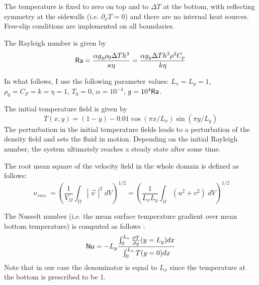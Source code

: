 The temperature is fixed to zero on top and to $\Delta T$ at the bottom, 
with reflecting symmetry at the sidewalls (i.e. $\partial_x T=0$) 
and there are no internal heat sources. 
Free-slip conditions are implemented on all boundaries. 

The Rayleigh number is given by
\begin{equation}
{\mathsf{Ra}} = \frac{\alpha g_y \rho_0 \Delta T h^3 }{\kappa \eta}
=\frac{\alpha g_y \Delta T h^3 \rho^2 C_p}{k \eta}
\end{equation}

In what follows, I use the following parameter values:  
$L_x=L_y=1$, $\rho_0=C_P=k=\eta=1$, $T_0=0$, $\alpha=10^{-4}$, $g=10^{4}{\mathsf{Ra}}$.

The initial temperature field is given by 
\begin{equation}
T(x,y)=(1-y) - 0.01\cos(\pi x/L_x) \sin(\pi y/L_y)
\end{equation}
The perturbation in the initial temperature fields leads to 
a perturbation of the density field and sets the fluid in motion. 
Depending on the initial Rayleigh number, the system ultimately reaches a 
steady state after some time. 

The root mean square of the velocity field in the whole domain is defined as 
follows:
\begin{equation}
\upnu_{rms}
= \left( \frac{1}{V_\Omega} \int_\Omega |{\vec \upnu}|^2 \; dV \right)^{1/2} 
= \left( \frac{1}{L_xL_y} \int_\Omega (u^2+v^2) \; dV \right)^{1/2} 
\label{eq_vrms}
\end{equation}


The Nusselt number (i.e. the mean surface temperature gradient over mean bottom temperature)
is computed as follows \cite{blbc89}:
\begin{equation}
{\mathsf{Nu}} = -L_y \frac{\int_0^{L_x} \frac{\partial T}{\partial y}(y=L_y) dx  }{\int_0^{L_x} T(y=0) dx}
\end{equation}
Note that in our case the denominator is equal to $L_x$ since the temperature at the 
bottom is prescribed to be 1.

